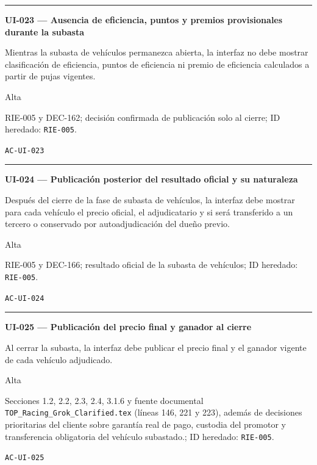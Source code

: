 \documentclass[10pt,letterpaper]{article}
\begin{document}
\vspace{0.25em}\hrule\vspace{0.65em}
\noindent\textbf{UI-023 --- Ausencia de eficiencia, puntos y premios provisionales durante la subasta}\par
\begin{description}[style=nextline,leftmargin=3.15cm,labelwidth=2.8cm,font=\normalfont\bfseries]
\item[Obligación] Mientras la subasta de vehículos permanezca abierta, la interfaz no debe mostrar clasificación de eficiencia, puntos de eficiencia ni premio de eficiencia calculados a partir de pujas vigentes.
\item[Prioridad] Alta
\item[Procedencia] RIE-005 y DEC-162; decisión confirmada de publicación solo al cierre; ID heredado: \texttt{RIE-005}.
\item[Verificación] \texttt{AC-UI-023}
\end{description}
\vspace{0.25em}\hrule\vspace{0.65em}
\noindent\textbf{UI-024 --- Publicación posterior del resultado oficial y su naturaleza}\par
\begin{description}[style=nextline,leftmargin=3.15cm,labelwidth=2.8cm,font=\normalfont\bfseries]
\item[Obligación] Después del cierre de la fase de subasta de vehículos, la interfaz debe mostrar para cada vehículo el precio oficial, el adjudicatario y si será transferido a un tercero o conservado por autoadjudicación del dueño previo.
\item[Prioridad] Alta
\item[Procedencia] RIE-005 y DEC-166; resultado oficial de la subasta de vehículos; ID heredado: \texttt{RIE-005}.
\item[Verificación] \texttt{AC-UI-024}
\end{description}
\vspace{0.25em}\hrule\vspace{0.65em}
\noindent\textbf{UI-025 --- Publicación del precio final y ganador al cierre}\par
\begin{description}[style=nextline,leftmargin=3.15cm,labelwidth=2.8cm,font=\normalfont\bfseries]
\item[Obligación] Al cerrar la subasta, la interfaz debe publicar el precio final y el ganador vigente de cada vehículo adjudicado.
\item[Prioridad] Alta
\item[Procedencia] Secciones 1.2, 2.2, 2.3, 2.4, 3.1.6 y fuente documental \texttt{TOP\_Racing\_Grok\_Clarified.tex} (líneas 146, 221 y 223), además de decisiones prioritarias del cliente sobre garantía real de pago, custodia del promotor y transferencia obligatoria del vehículo subastado.; ID heredado: \texttt{RIE-005}.
\item[Verificación] \texttt{AC-UI-025}
\end{description}
\end{document}
